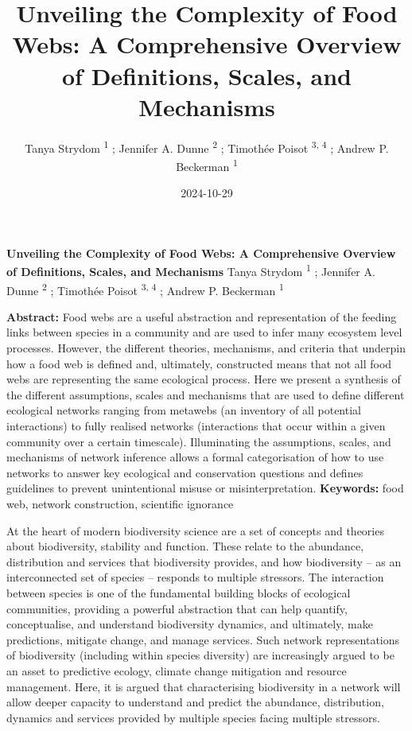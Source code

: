 \documentclass[
]{article}
\title{Unveiling the Complexity of Food Webs: A Comprehensive Overview
of Definitions, Scales, and Mechanisms}
\author{Tanya Strydom %
%
\textsuperscript{%
%
1%
}%
; Jennifer A. Dunne %
%
\textsuperscript{%
%
2%
}%
; Timothée Poisot %
%
\textsuperscript{%
3,%
4%
}%
; Andrew P. Beckerman %
%
\textsuperscript{%
%
1%
}%
}
\date{2024-10-29}
\begin{document}
\thispagestyle{empty}
{\bfseries\sffamily\Large Unveiling the Complexity of Food Webs: A
Comprehensive Overview of Definitions, Scales, and Mechanisms}
\vfil
Tanya Strydom %
%
\textsuperscript{%
%
1%
}%
; Jennifer A. Dunne %
%
\textsuperscript{%
%
2%
}%
; Timothée Poisot %
%
\textsuperscript{%
3,%
4%
}%
; Andrew P. Beckerman %
%
\textsuperscript{%
%
1%
}%

\vfil
{\small
\textbf{Abstract:} Food webs are a useful abstraction and representation
of the feeding links between species in a community and are used to
infer many ecosystem level processes. However, the different theories,
mechanisms, and criteria that underpin how a food web is defined and,
ultimately, constructed means that not all food webs are representing
the same ecological process. Here we present a synthesis of the
different assumptions, scales and mechanisms that are used to define
different ecological networks ranging from metawebs (an inventory of all
potential interactions) to fully realised networks (interactions that
occur within a given community over a certain timescale). Illuminating
the assumptions, scales, and mechanisms of network inference allows a
formal categorisation of how to use networks to answer key ecological
and conservation questions and defines guidelines to prevent
unintentional misuse or misinterpretation.
\vfil
\textbf{Keywords:} %
food web, network construction, %
scientific ignorance%
}
\clearpage
\setcounter{page}{1}
\doublespacing
\linenumbers


At the heart of modern biodiversity science are a set of concepts and
theories about biodiversity, stability and function. These relate to the
abundance, distribution and services that biodiversity provides, and how
biodiversity -- as an interconnected set of species -- responds to
multiple stressors. The interaction between species is one of the
fundamental building blocks of ecological communities, providing a
powerful abstraction that can help quantify, conceptualise, and
understand biodiversity dynamics, and ultimately, make predictions,
mitigate change, and manage services. Such network representations of
biodiversity (including within species diversity) are increasingly
argued to be an asset to predictive ecology, climate change mitigation
and resource management. Here, it is argued that characterising
biodiversity in a network will allow deeper capacity to understand and
predict the abundance, distribution, dynamics and services provided by
multiple species facing multiple stressors.
\end{document}
